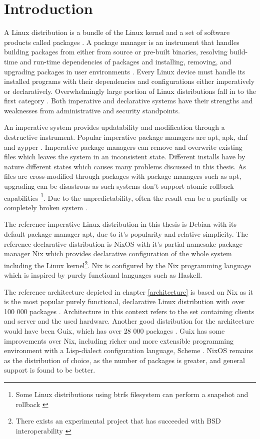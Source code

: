 \chapter{Introduction} \label{johdanto}

A Linux distribution is a bundle of the Linux kernel and a set of
software products called packages \cite{gnuPackagesx2014}. A package
manager is an instrument that handles building packages from either
from source or pre-built binaries, resolving build-time and run-time
dependencies of packages and installing, removing, and upgrading
packages in user environments \cite{gnuPackagesx2014}. Every Linux
device must handle its installed programs with their dependencies and
configurations either imperatively or declaratively. Overwhelmingly
large portion of Linux distributions fall in to the first category
\cite{dolstra2008nixos}. Both imperative and declarative systems have
their strengths and weaknesses from administrative and security
standpoints.

An imperative system provides updatability and modification through a
destructive instrument. Popular imperative package managers are apt,
apk, dnf and zypper \cite{dolstra2008nixos}. Imperative package
managers can remove and overwrite existing files which leaves the
system in an inconsistent state. Different installs have by nature
different states which causes many problems discussed in this
thesis. As files are cross-modified through packages with package
managers such as apt, upgrading can be disastrous as such systems
don't support atomic rollback capabilities \footnote{Some Linux
distributions using btrfs filesystem can perform a snapshot and
rollback \cite{opensuseSystemRecovery}}. Due to the unpredictability,
often the result can be a partially or completely broken system
\cite{dolstra2008nixos}.

The reference imperative Linux distribution in this thesis is Debian
with its default package manager apt, due to it's popularity and
relative simplicity. The reference declarative distribution is NixOS
with it's partial namesake package manager Nix which provides
declarative configuration of the whole system including the Linux
kernel\footnote{There exists an experimental project that has
succeeded with BSD interoperability
\cite{githubGitHubNixosbsdnixbsd}}. Nix is configured by the Nix
programming language which is inspired by purely functional languages
such as Haskell. \cite{van2013reference}

The reference architecture depicted in chapter \ref{architecture} is
based on Nix as it is the most popular purely functional, declarative
Linux distribution with over 100 000 packages
\cite{nixosNixOSSearch}. Architecture in this context refers to the
set containing clients and server and the used hardware. Another good
distribution for the architecture would have been Guix, which has over
28 000 packages \cite{gnuPackagesx2014}. Guix has some improvements
over Nix, including richer and more extensible programming environment
with a Lisp-dialect configuration language, Scheme
\cite{courtes2021deploiements}. NixOS remains as the distribution of
choice, as the number of packages is greater, and general support is
found to be better.

